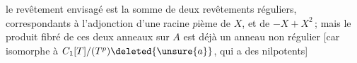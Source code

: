 le revêtement envisagé est la somme de deux revêtements réguliers, correspondants  à l'adjonction d'une racine $p$ième de $X$, et de $-X+X^2$\,;
mais le produit fibré de ces deux anneaux  sur $A$ est déjà un anneau non régulier [car isomorphe à $C_1[T]/(T^p)\deleted{\unsure{a}}$, qui a des  nilpotents]
